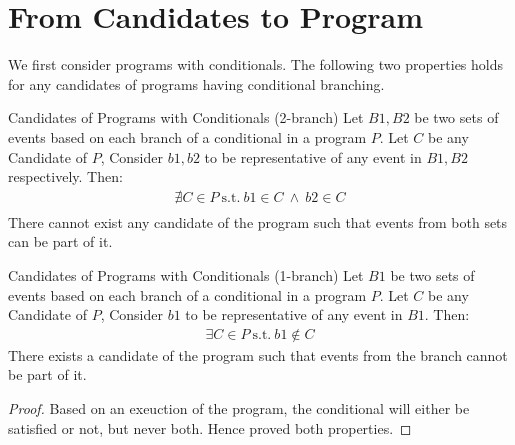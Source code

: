 \section{From Candidates to Program}

    We first consider programs with conditionals. The following two properties holds for any candidates of programs having conditional branching. 

    \begin{property}{Candidates of Programs with Conditionals (2-branch)}
        \label{CondB2}
        Let $B1,B2$ be two sets of events based on each branch of a conditional in a program $P$. Let $C$ be any Candidate of $P$, Consider $b1,b2$ to be representative of any event in $B1,B2$ respectively. Then:
        \begin{align*}
            \nexists C \in P \ \text{s.t.} \ b1 \in C \ \wedge \ b2 \in C \\ 
        \end{align*}
        There cannot exist any candidate of the program such that events from both sets can be part of it. 
    \end{property}

    \begin{property}{Candidates of Programs with Conditionals (1-branch)}
        \label{CondB1}
        Let $B1$ be two sets of events based on each branch of a conditional in a program $P$. Let $C$ be any Candidate of $P$, Consider $b1$ to be representative of any event in $B1$. Then:
        \begin{align*}
            \exists C \in P \ \text{s.t.} \ b1 \notin C  
        \end{align*}
        There exists a candidate of the program such that events from the branch cannot be part of it. 
    \end{property}



    \begin{proof}
        Based on an exeuction of the program, the conditional will either be satisfied or not, but never both. Hence proved both properties. 
    \end{proof}

